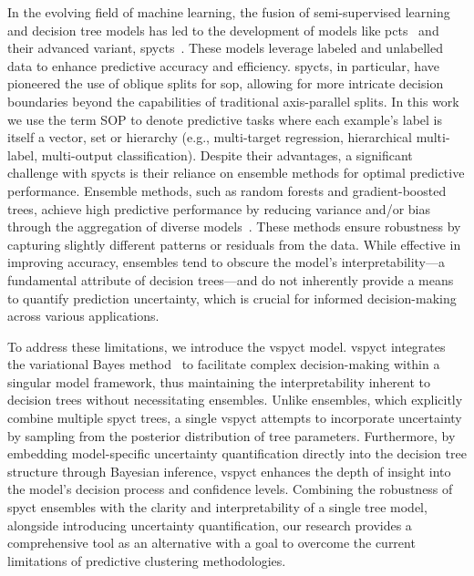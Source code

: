 \documentclass[3p,review,authoryear]{elsarticle}
\begin{document}
In the evolving field of machine learning, the fusion of semi-supervised learning and decision tree models has led to the development of models like \glspl{pct}~\citep{Kocev_2013} and their advanced variant, \glspl{spyct}~\citep{Stepi_nik_2021}.
These models leverage labeled and unlabelled data to enhance predictive accuracy and efficiency.
\Glspl{spyct}, in particular, have pioneered the use of oblique splits for \gls{sop}, allowing for more intricate decision boundaries beyond the capabilities of traditional axis-parallel splits.
In this work we use the term SOP to denote predictive tasks where each example’s label is itself a vector, set or hierarchy (e.g., multi-target regression, hierarchical multi-label, multi-output classification).
Despite their advantages, a significant challenge with \glspl{spyct} is their reliance on ensemble methods for optimal predictive performance.
Ensemble methods, such as random forests and gradient-boosted trees, achieve high predictive performance by reducing variance and/or bias through the aggregation of diverse models~\cite{Breiman_2001, Kocev_2020, Friedman_2001}.
These methods ensure robustness by capturing slightly different patterns or residuals from the data.
While effective in improving accuracy, ensembles tend to obscure the model's interpretability—a fundamental attribute of decision trees—and do not inherently provide a means to quantify prediction uncertainty, which is crucial for informed decision-making across various applications.

To address these limitations, we introduce the \gls{vspyct} model.
\gls{vspyct} integrates the variational Bayes method~\citep{Blei_2017} to facilitate complex decision-making within a singular model framework, thus maintaining the interpretability inherent to decision trees without necessitating ensembles.
Unlike ensembles, which explicitly combine multiple \gls{spyct} trees, a single \gls{vspyct} attempts to incorporate uncertainty by sampling from the posterior distribution of tree parameters.
Furthermore, by embedding model-specific uncertainty quantification directly into the decision tree structure through Bayesian inference, \gls{vspyct} enhances the depth of insight into the model's decision process and confidence levels.
Combining the robustness of \gls{spyct} ensembles with the clarity and interpretability of a single tree model, alongside introducing uncertainty quantification, our research provides a comprehensive tool as an alternative with a goal to overcome the current limitations of predictive clustering methodologies.
\end{document}
